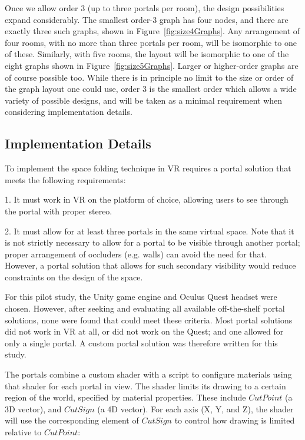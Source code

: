 \documentclass{sigchi}
\begin{document}
Once we allow order 3 (up to three portals per room), the design possibilities expand considerably.  The smallest order-3 graph has four nodes, and there are exactly three such graphs, shown in Figure~\ref{fig:size4Graphs}.  Any arrangement of four rooms, with no more than three portals per room, will be isomorphic to one of these.  Similarly, with five rooms, the layout will be isomorphic to one of the eight graphs shown in Figure~\ref{fig:size5Graphs}.  Larger or higher-order graphs are of course possible too.  While there is in principle no limit to the size or order of the graph layout one could use, order 3 is the smallest order which allows a wide variety of possible designs, and will be taken as a minimal requirement when considering implementation details.

\subsection{Implementation Details}

To implement the space folding technique in VR requires a portal solution that meets the following requirements:

1. It must work in VR on the platform of choice, allowing users to see through the portal with proper stereo.

2. It must allow for at least three portals in the same virtual space.  Note that it is not strictly necessary to allow for a portal to be visible through another portal; proper arrangement of occluders (e.g. walls) can avoid the need for that.  However, a portal solution that allows for such secondary visibility would reduce constraints on the design of the space.

For this pilot study, the Unity game engine and Oculus Quest headset were chosen.  However, after seeking and evaluating all available off-the-shelf portal solutions, none were found that could meet these criteria.  Most portal solutions did not work in VR at all, or did not work on the Quest; and one allowed for only a single portal.  A custom portal solution was therefore written for this study.

The portals combine a custom shader with a script to configure materials using that shader for each portal in view.  The shader limits its drawing to a certain region of the world, specified by material properties.  These include $CutPoint$ (a 3D vector), and $CutSign$ (a 4D vector).  For each axis (X, Y, and Z), the shader will use the corresponding element of $CutSign$ to control how drawing is limited relative to $CutPoint$:
\end{document}
